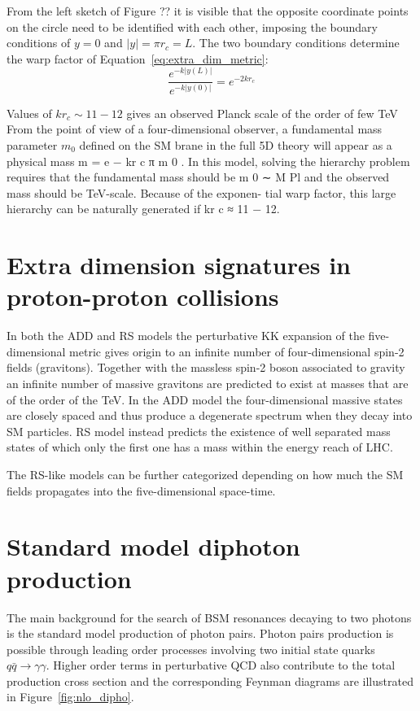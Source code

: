 From the left sketch of Figure ?? it is visible that the opposite coordinate points on the circle need to be
identified with each other, imposing the boundary conditions of $y = 0$ and $|y| = \pi r_c = L$.
The two boundary conditions determine the warp factor of Equation~\ref{eq:extra_dim_metric}:
\[
  \frac{e^{-k|y(L)|}}{e^{-k|y(0)|}} = e^{-2kr_c}
\]



Values of $kr_c \sim 11-12$ gives an observed Planck scale of the order of few TeV
From the point of view of a four-dimensional observer, a fundamental mass
parameter $m_0$ defined on the SM brane in the full 5D theory will appear as a physical mass
m = e − kr c π m 0 . In this model, solving the hierarchy problem requires that the fundamental
mass should be m 0 ∼ M Pl and the observed mass should be TeV-scale. Because of the exponen-
tial warp factor, this large hierarchy can be naturally generated if kr c ≈ 11 − 12.

\section{Extra dimension signatures in proton-proton collisions}
In both the ADD and RS models the perturbative KK expansion of the five-dimensional metric
gives origin to an infinite number of four-dimensional spin-2 fields (gravitons). Together with
the massless spin-2 boson associated to gravity an infinite number of massive gravitons are predicted to exist
at masses that are of the order of the TeV.
In the ADD model the four-dimensional massive states
are closely spaced and thus produce a degenerate spectrum when they decay into SM particles.
RS model instead predicts the existence of well separated mass states of which only the first one has a mass
within the energy reach of LHC.

The RS-like models can be further categorized depending on how much the SM fields propagates into the five-dimensional
space-time. 

\section{Standard model diphoton production}
\label{sec:sm_dipho_prod}
The main background for the search of BSM resonances decaying to two photons is the standard model production
of photon pairs. Photon pairs production is possible through leading order processes involving two
initial state quarks $q\bar{q}\to\gamma\gamma$. Higher order terms in perturbative QCD also contribute to
the total production cross section and the corresponding Feynman diagrams are illustrated in Figure~\ref{fig:nlo_dipho}.

